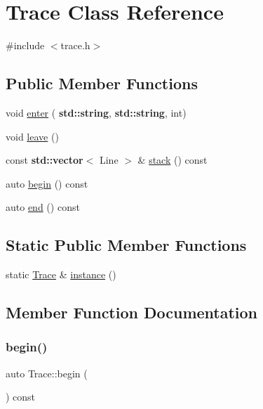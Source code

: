 \hypertarget{class_trace}{}\section{Trace Class Reference}
\label{class_trace}


{\ttfamily \#include $<$trace.\+h$>$}

\subsection*{Public Member Functions}
\begin{DoxyCompactItemize}
\item 
void \hyperlink{class_trace_a61142361cf22f613055bf7a74c3d4ecf}{enter} (\textbf{ std\+::string}, \textbf{ std\+::string}, int)
\item 
void \hyperlink{class_trace_ad8d6fe43bf7fc6d770d317da87557b42}{leave} ()
\item 
const \textbf{ std\+::vector}$<$ Line $>$ \& \hyperlink{class_trace_af87e0b98ad06d327c7a11c90dc8c8958}{stack} () const
\item 
auto \hyperlink{class_trace_a5e7444bb4c3af7baf0217da5a495b1f8}{begin} () const
\item 
auto \hyperlink{class_trace_aaeba765b0abb18e1d45d1580b82e8fb4}{end} () const
\end{DoxyCompactItemize}
\subsection*{Static Public Member Functions}
\begin{DoxyCompactItemize}
\item 
static \hyperlink{class_trace}{Trace} \& \hyperlink{class_trace_a60d1c997d646ffd36310ffd79dd08b14}{instance} ()
\end{DoxyCompactItemize}


\subsection{Member Function Documentation}
\mbox{\label{class_trace_a5e7444bb4c3af7baf0217da5a495b1f8}} 
\subsubsection{\texorpdfstring{begin()}{begin()}}
{\footnotesize\ttfamily auto Trace\+::begin (\begin{DoxyParamCaption}{ }\end{DoxyParamCaption}) const\hspace{0.3cm}{\ttfamily [inline]}}


